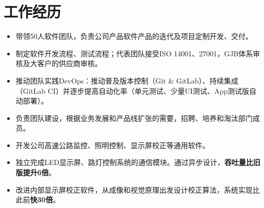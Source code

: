 \documentclass[10pt,a4paper]{moderncv}
\begin{document}
\maketitle


\section{工作经历}


{
\begin{itemize}
	\item 带领50人软件团队，负责公司产品软件产品的迭代及项目定制开发、交付。
	\item 制定软件开发流程、测试流程；代表团队接受ISO 14001、27001，GJB体系审核及大客户的供应商审核。
	\item 推动团队实践DevOps：推动普及版本控制（Git \& GitLab）、持续集成（GitLab CI）并逐步提高自动化率（单元测试、少量UI测试、App测试版自动部署）。
	\item 负责团队建设，根据业务发展和产品线扩张的需要，招聘、培养和淘汰部门成员。
\end{itemize}
}


{
\begin{itemize}
	\item 开发公司高速公路监控、照明控制、显示屏校正等通用软件。
	\item 独立完成LED显示屏、路灯控制系统的通信模块。通过异步设计，\textbf{吞吐量比旧版提升6倍}。
	\item 改进内部显示屏校正软件，从成像和视觉原理出发设计校正算法，系统实现比此前\textbf{快30倍}。
\end{itemize}
}
\end{document}
